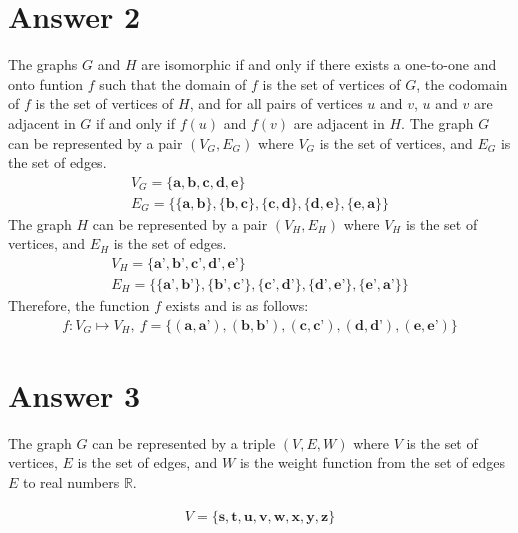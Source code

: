 \documentclass[12pt]{article}
\begin{document}
\section*{Answer 2}

The graphs $G$ and $H$ are isomorphic if and only if there exists a one-to-one and onto funtion $f$ such that the domain of $f$ is the set of vertices of $G$, the codomain of $f$ is the set of vertices of $H$, and for all pairs of vertices $u$ and $v$, $u$ and $v$ are adjacent in $G$ if and only if $f(u)$ and $f(v)$ are adjacent in $H$.
\newline
The graph $G$ can be represented by a pair $(V_G, E_G)$ where $V_G$ is the set of vertices, and $E_G$ is the set of edges.
\begin{gather*}
V_G = \{\textbf{a}, \textbf{b}, \textbf{c}, \textbf{d}, \textbf{e}\} \\
E_G = \{\{\textbf{a}, \textbf{b}\}, \{\textbf{b}, \textbf{c}\}, \{\textbf{c}, \textbf{d}\}, \{\textbf{d}, \textbf{e}\}, \{\textbf{e}, \textbf{a}\}\}
\end{gather*}
The graph $H$ can be represented by a pair $(V_H, E_H)$ where $V_H$ is the set of vertices, and $E_H$ is the set of edges.
\begin{gather*}
V_H = \{\textbf{a'}, \textbf{b'}, \textbf{c'}, \textbf{d'}, \textbf{e'}\} \\
E_H = \{\{\textbf{a'}, \textbf{b'}\}, \{\textbf{b'}, \textbf{c'}\}, \{\textbf{c'}, \textbf{d'}\}, \{\textbf{d'}, \textbf{e'}\}, \{\textbf{e'}, \textbf{a'}\}\}
\end{gather*}
Therefore, the function $f$ exists and is as follows:
\begin{gather*}
f:V_G \mapsto V_H,\ f = \{(\textbf{a}, \textbf{a'}), (\textbf{b}, \textbf{b'}), (\textbf{c}, \textbf{c'}), (\textbf{d}, \textbf{d'}), (\textbf{e}, \textbf{e'})\}
\end{gather*}

\newpage

\section*{Answer 3}

The graph $G$ can be represented by a triple $(V, E, W)$ where $V$ is the set of vertices, $E$ is the set of edges, and $W$ is the weight function from the set of edges $E$ to real numbers $\mathbb{R}$.

\begin{gather*}
V = \{\textbf{s}, \textbf{t}, \textbf{u}, \textbf{v}, \textbf{w}, \textbf{x}, \textbf{y}, \textbf{z}\}
\end{gather*}
\end{document}
